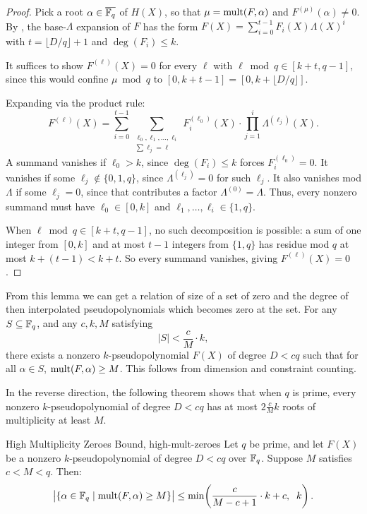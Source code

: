 \begin{proof}
  Pick a root $\alpha \in \overline{\mathbb{F}_q}$ of $H(X)$, so that $\mu = \operatorname{mult}(F, \alpha)$ and $F^{(\mu)}(\alpha) \neq 0$. By , the base-$\Lambda$ expansion of $F$ has the form $F(X) = \sum_{i=0}^{t-1} F_i(X)\Lambda(X)^i$ with $t = \lfloor D/q \rfloor + 1$ and $\deg(F_i) \leq k$.

  It suffices to show $F^{(\ell)}(X) = 0$ for every $\ell$ with $\ell \bmod q \in [k + t, q - 1]$, since this would confine $\mu \bmod q$ to $[0, k + t - 1] = [0, k + \lfloor D/q \rfloor]$.

  Expanding via the product rule:
  \[
    F^{(\ell)}(X) = \sum_{i=0}^{t-1} \sum_{\substack{\ell_0, \ell_1, \ldots, \ell_i \\ \sum \ell_j = \ell}} F_i^{(\ell_0)}(X) \cdot \prod_{j=1}^{i} \Lambda^{(\ell_j)}(X).
  \]
  A summand vanishes if $\ell_0 > k$, since $\deg(F_i) \leq k$ forces $F_i^{(\ell_0)} = 0$. It vanishes if some $\ell_j \notin \{0, 1, q\}$, since $\Lambda^{(\ell_j)} = 0$ for such $\ell_j$. It also vanishes mod $\Lambda$ if some $\ell_j = 0$, since that contributes a factor $\Lambda^{(0)} = \Lambda$. Thus, every nonzero summand must have $\ell_0 \in [0, k]$ and $\ell_1, \ldots, \ell_i \in \{1, q\}$.

  When $\ell \bmod q \in [k + t, q - 1]$, no such decomposition is possible: a sum of one integer from $[0,k]$ and at most $t - 1$ integers from $\{1, q\}$ has residue mod $q$ at most $k + (t - 1) < k + t$. So every summand vanishes, giving $F^{(\ell)}(X) = 0$.
\end{proof}

From this lemma we can get a relation of size of a set of zero and the degree of then interpolated pseudopolynomials which becomes zero at the set. For any $S \subseteq \mathbb{F}_q$, and any $c, k, M$ satisfying
$$  |S| < \frac{c}{M} \cdot k,$$ there exists a nonzero $k$-pseudopolynomial $F(X)$ of degree $D < cq$ such that for all $\alpha \in S$, $\operatorname{mult}(F,\alpha) \geq M$. This follows from dimension and constraint counting.

In the reverse direction, the following theorem shows that when $q$ is prime, every nonzero $k$-pseudopolynomial of degree $D < cq$ has at most $2\frac{c}{M}k$ roots of multiplicity at least $M$.

\begin{Theorem}{High Multiplicity Zeroes Bound, \cite{Kopparty2026}}{high-mult-zeroes}
  Let $q$ be prime, and let $F(X)$ be a nonzero $k$-pseudopolynomial of degree $D < cq$ over $\mathbb{F}_q$. Suppose $M$ satisfies $c < M < q$. Then:
  \[
    \bigl|\{\alpha \in \mathbb{F}_q \mid \operatorname{mult}(F,\alpha) \geq M\}\bigr|
    \leq \min\!\left(\frac{c}{M - c + 1}\cdot k + c,\;\; k\right).
  \]
\end{Theorem}

